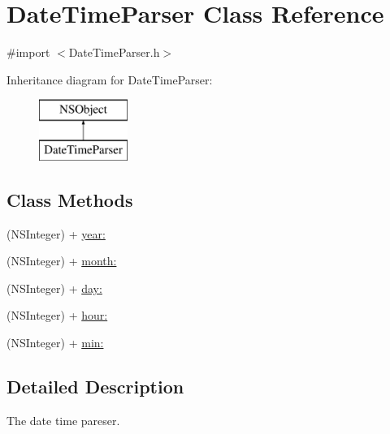 \hypertarget{interface_date_time_parser}{\section{Date\+Time\+Parser Class Reference}
\label{interface_date_time_parser}
}


{\ttfamily \#import $<$Date\+Time\+Parser.\+h$>$}

Inheritance diagram for Date\+Time\+Parser\+:\begin{figure}[H]
\begin{center}
\leavevmode
\includegraphics[height=2.000000cm]{interface_date_time_parser}
\end{center}
\end{figure}
\subsection*{Class Methods}
\begin{DoxyCompactItemize}
\item 
(N\+S\+Integer) + \hyperlink{interface_date_time_parser_a55231e1512eef70e1c551ca833326d75}{year\+:}
\item 
(N\+S\+Integer) + \hyperlink{interface_date_time_parser_af59822ee3b3334cd759b98a2cb9b776c}{month\+:}
\item 
(N\+S\+Integer) + \hyperlink{interface_date_time_parser_abb97d88f3b90f79e7479938a381b2f04}{day\+:}
\item 
(N\+S\+Integer) + \hyperlink{interface_date_time_parser_af7098a270403be453d8a197baacb7c46}{hour\+:}
\item 
(N\+S\+Integer) + \hyperlink{interface_date_time_parser_a62b5e9cf5b8112f93e72c8073a77a6b3}{min\+:}
\end{DoxyCompactItemize}


\subsection{Detailed Description}
The date time pareser. 

